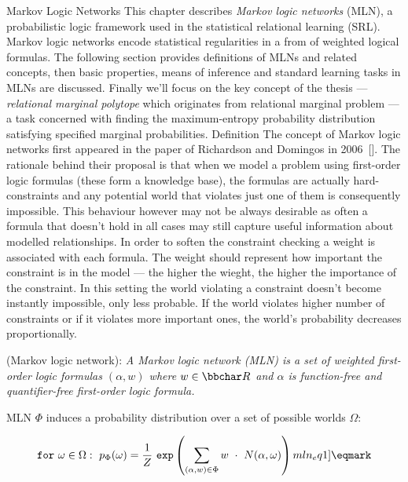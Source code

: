 \chap Markov Logic Networks
This chapter describes {\it Markov logic networks} (MLN), a probabilistic logic framework used in the statistical relational learning (SRL). Markov logic networks encode statistical regularities in a from of weighted logical formulas. The following section provides definitions of MLNs and related concepts, then basic properties, means of inference and standard learning tasks in MLNs are discussed. Finally we'll focus on the key concept of the thesis --- {\it relational marginal polytope} which originates from relational marginal problem --- a task concerned with finding the maximum-entropy probability distribution satisfying specified marginal probabilities.
\sec Definition
The concept of Markov logic networks first appeared in the paper of Richardson and Domingos in 2006~[\rcite[Richardson2006]]. The rationale behind their proposal is that when we model a problem using first-order logic formulas (these form a knowledge base), the formulas are actually hard-constraints and any potential world that violates just one of them is consequently impossible. This behaviour however may not be always desirable as often a formula that doesn't hold in all cases may still capture useful information about modelled relationships. In order to soften the constraint checking a weight is associated with each formula. The weight should represent how important the constraint is in the model --- the higher the wieght, the higher the importance of the constraint. In this setting the world violating a constraint doesn't become instantly impossible, only less probable. If the world violates higher number of constraints or if it violates more important ones, the world's probability decreases proportionally. 
\par{} (Markov logic network): {\it A Markov logic network (MLN) is a set of weighted first-order logic formulas 
$(\alpha, w)$ where $w \in \bbchar R\/$ and $\alpha$ is function-free and quantifier-free first-order logic formula.}
\par MLN $\Phi$ induces a probability distribution over a set of possible worlds $\Omega$:

$$ {\tt for~} \omega \in \Omega: ~ p_{\Phi}(\omega) = {{1}\over{Z}} ~ {\tt exp}\left( {\sum_{(\alpha, w) \in \Phi} {w ~\cdot~ N(\alpha,\omega) }} \right) \label[mln_eq1]\eqmark $$


